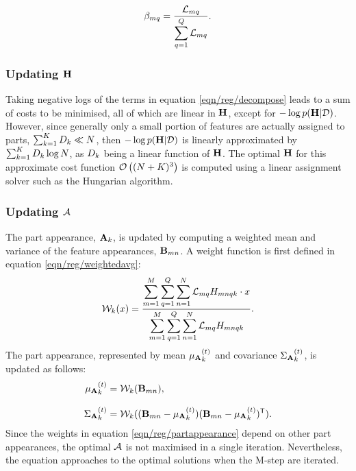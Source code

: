 \begin{equation}
{\beta}_{mq} = 
\frac{\mathcal{L}_{mq}}{\displaystyle\sum_{q = 1}^{Q} \mathcal{L}_{mq}}.
\end{equation}

\subsubsection{Updating $\mathbf{H}$}
Taking negative logs of the terms in equation \ref{eqn/reg/decompose} leads to a sum of costs to be minimised, all of which are linear in $\mathbf{H}$, except for $-\log p(\mathbf{H}|\mathcal{D})$. 
However, since generally only a small portion of features are actually assigned to parts, \ie $\sum_{k=1}^{K}{D}_k \ll N$, then $-\log p(\mathbf{H}|\mathcal{D})$ is linearly approximated by $\sum_{k=1}^{K}{D}_k\log N$,  as ${D}_k$ being a linear function of $\mathbf{H}$. The optimal $\mathbf{H}$ for this approximate cost function $\mathcal{O}\left((N + K)^3\right)$ is computed using a linear assignment solver such as the Hungarian algorithm.  

\subsubsection{Updating $\mathcal{A}$}
The part appearance, $\mathbf{A}_k$, is updated by computing a weighted mean and variance of the feature appearances, $\mathbf{B}_{mn}$. A weight function is first defined in equation \ref{eqn/reg/weightedavg}:
\begin{equation}
	\mathcal{W}_k(x) = \frac{\displaystyle\sum_{m=1}^M \displaystyle\sum_{q = 1}^{Q} \displaystyle\sum_{n=1}^{N}\mathcal{L}_{mq}{H}_{mnqk} \cdot x}{\displaystyle\sum_{m=1}^M \displaystyle\sum_{q = 1}^{Q} \displaystyle\sum_{n=1}^{N}\mathcal{L}_{mq}{H}_{mnqk}}.
	\label{eqn/reg/weightedavg} 
\end{equation}
The part appearance, represented by mean ${\mu_{\mathbf{A}}}_{k}^{(t)}$ and covariance ${\Sigma_{\mathbf{A}}}_{k}^{(t)}$, is updated as follows:  
\begin{equation}
	\begin{aligned}
		{\mu_{\mathbf{A}}}_{k}^{(t)} & = \mathcal{W}_k(\mathbf{B}_{mn}), \\[3mm]  
		{\Sigma_{\mathbf{A}}}_{k}^{(t)} & = \mathcal{W}_k((\mathbf{B}_{mn} - {\mu_{\mathbf{A}}}_{k}^{(t)})(\mathbf{B}_{mn} - {\mu_{\mathbf{A}}}_{k}^{(t)})^{\textsf{T}}).
	\end{aligned}
	\label{eqn/reg/partappearance}
\end{equation}
Since the weights in equation \ref{eqn/reg/partappearance} depend on other part appearances, the optimal $\mathcal{A}$ is not maximised in a single iteration. Nevertheless, the equation approaches to the optimal solutions when the M-step are iterated. 

